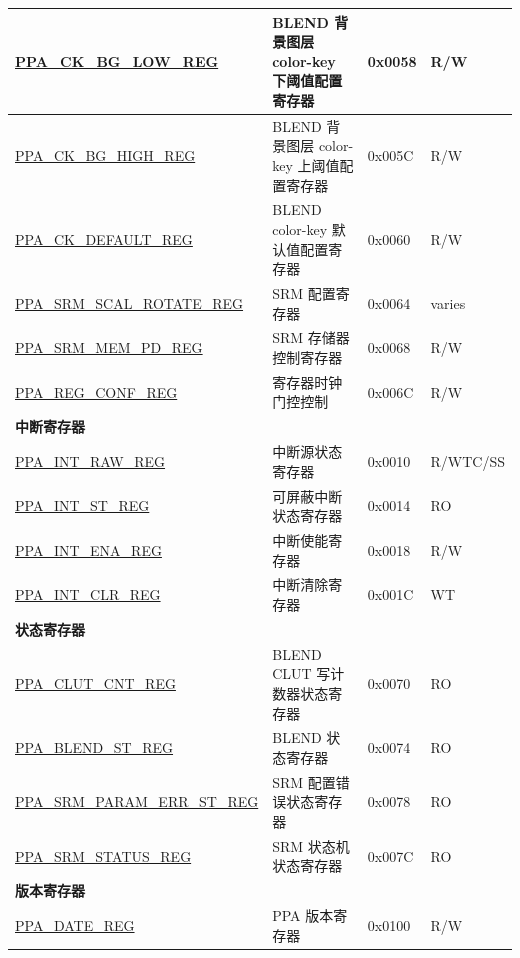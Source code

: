 \begin{longtable}{ | p{6cm} | p{7.2cm} | p{1.3cm} | p{1cm} | }
\hyperref[regdesc:PPACKBGLOWREG]{PPA\_CK\_BG\_LOW\_REG} & BLEND 背景图层 color-key 下阈值配置寄存器 & 0x0058 & R/W \\ \hline
\hyperref[regdesc:PPACKBGHIGHREG]{PPA\_CK\_BG\_HIGH\_REG} & BLEND 背景图层 color-key 上阈值配置寄存器 & 0x005C & R/W \\ \hline
\hyperref[regdesc:PPACKDEFAULTREG]{PPA\_CK\_DEFAULT\_REG} & BLEND color-key 默认值配置寄存器 & 0x0060 & R/W \\ \hline
\hyperref[regdesc:PPASRMSCALROTATEREG]{PPA\_SRM\_SCAL\_ROTATE\_REG} & SRM 配置寄存器 & 0x0064 & varies \\ \hline
\hyperref[regdesc:PPASRMMEMPDREG]{PPA\_SRM\_MEM\_PD\_REG} & SRM 存储器控制寄存器 & 0x0068 & R/W \\ \hline
\hyperref[regdesc:PPAREGCONFREG]{PPA\_REG\_CONF\_REG} & 寄存器时钟门控控制 & 0x006C & R/W \\ \hline
\multicolumn{4}{|l|}{\textbf{中断寄存器}} \\ \hline
\hyperref[regdesc:PPAINTRAWREG]{PPA\_INT\_RAW\_REG} & 中断源状态寄存器 & 0x0010 & R/WTC/SS \\ \hline
\hyperref[regdesc:PPAINTSTREG]{PPA\_INT\_ST\_REG} & 可屏蔽中断状态寄存器 & 0x0014 & RO \\ \hline
\hyperref[regdesc:PPAINTENAREG]{PPA\_INT\_ENA\_REG} & 中断使能寄存器 & 0x0018 & R/W \\ \hline
\hyperref[regdesc:PPAINTCLRREG]{PPA\_INT\_CLR\_REG} & 中断清除寄存器 & 0x001C & WT \\ \hline
\multicolumn{4}{|l|}{\textbf{状态寄存器}} \\ \hline
\hyperref[regdesc:PPACLUTCNTREG]{PPA\_CLUT\_CNT\_REG} & BLEND CLUT 写计数器状态寄存器 & 0x0070 & RO \\ \hline
\hyperref[regdesc:PPABLENDSTREG]{PPA\_BLEND\_ST\_REG} & BLEND 状态寄存器 & 0x0074 & RO \\ \hline
\hyperref[regdesc:PPASRMPARAMERRSTREG]{PPA\_SRM\_PARAM\_ERR\_ST\_REG} & SRM 配置错误状态寄存器 & 0x0078 & RO \\ \hline
\hyperref[regdesc:PPASRMSTATUSREG]{PPA\_SRM\_STATUS\_REG} & SRM 状态机状态寄存器 & 0x007C & RO \\ \hline
\multicolumn{4}{|l|}{\textbf{版本寄存器}} \\ \hline
\hyperref[regdesc:PPADATEREG]{PPA\_DATE\_REG} & PPA 版本寄存器 & 0x0100 & R/W \\ \hline
\end{longtable}
